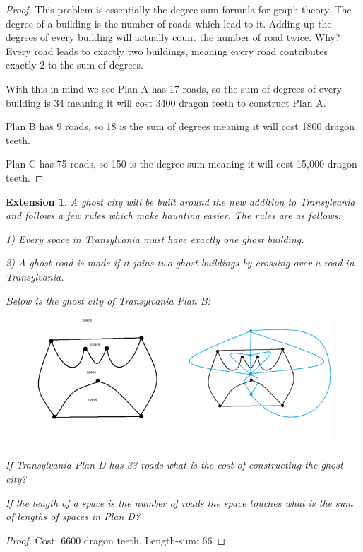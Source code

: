 \documentclass{article}
\newtheorem{extension}{Extension}
\begin{document}
\begin{proof}
This problem is essentially the degree-sum formula for graph theory. The degree of a building is the number of roads which lead to it. Adding up the degrees of every building will actually count the number of road twice. Why? Every road leads to exactly two buildings, meaning every road contributes exactly 2 to the sum of degrees.

With this in mind we see Plan A has 17 roads, so the sum of degrees of every building is 34 meaning it will cost 3400 dragon teeth to construct Plan A.

Plan B has 9 roads, so 18 is the sum of degrees meaning it will cost 1800 dragon teeth.

Plan C has 75 roads, so 150 is the degree-sum meaning it will cost 15,000 dragon teeth.
\end{proof}

\begin{extension}
A ghost city will be built around the new addition to Transylvania and follows a few rules which make haunting easier. The rules are as follows:

1) Every space in Transylvania must have exactly one ghost building.

2) A ghost road is made if it joins two ghost buildings by crossing over a road in Transylvania.


Below is the ghost city of Transylvania Plan B:
\begin{figure}[h!]
\centering
\includegraphics[scale=.7]{ghostplans}
\end{figure}

If Transylvania Plan D has 33 roads what is the cost of constructing the ghost city?

If the length of a space is the number of roads the space touches what is the sum of lengths of spaces in Plan D?
\end{extension}
\begin{proof}
Cost: 6600 dragon teeth. Length-sum: 66
\end{proof}
\end{document}
